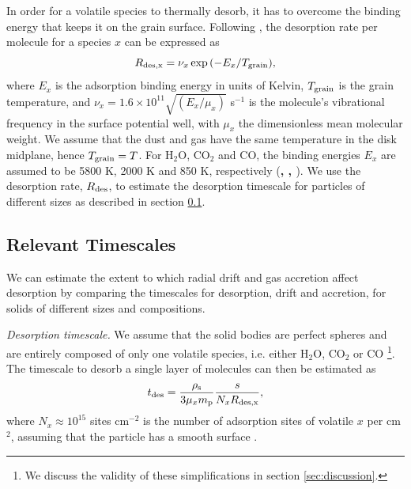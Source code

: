 \documentclass[apj]{emulateapj}
\newcommand{\emgr}[1]{\emph{ \color{gray} #1}}
\begin{document}

In order for a volatile species to thermally desorb, it has to overcome the binding energy that keeps it on the grain surface. Following \citet{hollenbach09}, the desorption rate per molecule for a species $x$ can be expressed as
\begin{equation}
\label{eq:Rdes}
R_{\rm{des}, x} = \nu_x \exp{(-E_x/T_{\rm grain})},
\end{equation}
where $E_x$ is the adsorption binding energy in units of Kelvin, $T_{\rm grain}$ is the grain temperature, and $\nu_x=1.6 \times 10^{11} \sqrt{(E_x/\mu_x)}$ s$^{-1}$ is the molecule's vibrational frequency in the surface potential well, with $\mu_x$ the dimensionless mean molecular weight. We assume that the dust and gas have the same temperature in the disk midplane, hence $T_{\rm grain}=T$. For H$_2$O, CO$_2$ and CO, the binding energies $E_x$ are assumed to be 5800 K, 2000 K and 850 K, respectively (\textbf{\citealt{collings04}, \citealt{fraser01}, \citealt{aikawa96}}). We use the desorption rate, $R_{\rm des}$, to estimate the desorption timescale for particles of different sizes as described in section \ref{sec:timescales}. 




\subsection{Relevant Timescales}
\label{sec:timescales}

We can estimate the extent to which radial drift and gas accretion affect desorption by comparing the timescales for desorption, drift and accretion, for solids of different sizes and compositions. 

\textit{Desorption timescale.} We assume that the solid bodies are perfect spheres and are entirely composed of only one volatile species, i.e. either H$_2$O, CO$_2$ or CO \footnote{We discuss the validity of these simplifications in section \ref{sec:discussion}.}. The timescale to desorb a single layer of molecules can then be estimated as
\begin{equation}
\label{eq:tdes}
t_{\rm des}=\frac{\rho_{\rm s}}{3 \mu_x m_{\rm p}} \frac{s}{N_x R_{\rm des, x}},
\end{equation}
where $N_x \approx 10^{15}$ sites cm$^{-2}$ is the number of adsorption sites of volatile $x$ per cm$^2$, assuming that the particle has a smooth surface \citep{hollenbach09}. 
\end{document}
